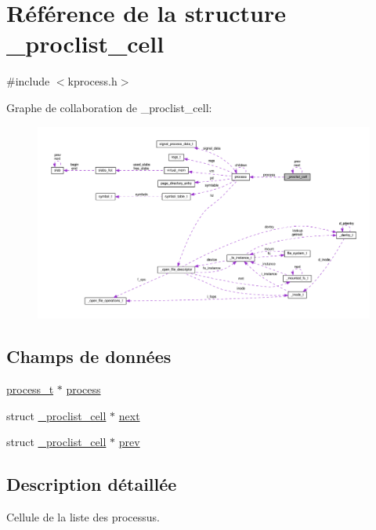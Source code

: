 \hypertarget{struct__proclist__cell}{\section{Référence de la structure \+\_\+proclist\+\_\+cell}
\label{struct__proclist__cell}
}


{\ttfamily \#include $<$kprocess.\+h$>$}



Graphe de collaboration de \+\_\+proclist\+\_\+cell\+:
\nopagebreak
\begin{figure}[H]
\begin{center}
\leavevmode
\includegraphics[width=350pt]{struct__proclist__cell__coll__graph}
\end{center}
\end{figure}
\subsection*{Champs de données}
\begin{DoxyCompactItemize}
\item 
\hyperlink{kprocess_8h_a7742ed3a86b7bcb5a4b76893fc331ede}{process\+\_\+t} $\ast$ \hyperlink{struct__proclist__cell_abe320ebc4ea6556f17dd28e93efb6b31}{process}
\item 
struct \hyperlink{struct__proclist__cell}{\+\_\+proclist\+\_\+cell} $\ast$ \hyperlink{struct__proclist__cell_a76062c3c8bce7b458ed610e7568c0858}{next}
\item 
struct \hyperlink{struct__proclist__cell}{\+\_\+proclist\+\_\+cell} $\ast$ \hyperlink{struct__proclist__cell_aee5c3bd7595d05c693fe6df63937052e}{prev}
\end{DoxyCompactItemize}


\subsection{Description détaillée}
Cellule de la liste des processus. 

